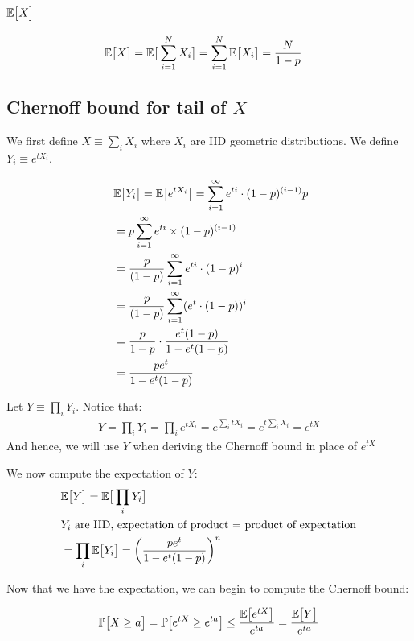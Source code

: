 \documentclass{article}
\begin{document}
\subsection{$\mathbb{E}\big[ X \big]$}
\begin{align*}
    &\mathbb{E}\big[ X \big] = \mathbb{E}\big[ \sum_{i=1}^N X_i \big] = \sum_{i=1}^N \mathbb{E}\big[ X_i \big] = \frac{N}{1 - p}
\end{align*}
\subsection{Chernoff bound for tail of $X$}

We first define $X \equiv \sum_i X_i$ where $X_i$ are IID geometric distributions.
We define $Y_i \equiv e^{t X_i}$.

\begin{align*}
&\mathbb{E}\big[ Y_i \big] = \mathbb{E}\big[ e^{tX_i} \big] = \sum_{i=1}^{\infty} e^{ti} \cdot (1-p)^{(i - 1)} p \\
&= p \sum_{i=1}^{\infty} e^{ti} \times (1-p)^{(i - 1)} \\\
&= \frac{p}{(1 - p)} \sum_{i=1}^{\infty} e^{ti}  \cdot (1-p)^i \\
&= \frac{p}{(1 - p)} \sum_{i=1}^{\infty} (e^{t}\cdot  (1-p))^i \\
&= \frac{p}{1 - p} \cdot \frac{e^t (1 - p)}{1 - e^t (1 - p)}  \\
&= \frac{pe^t}{1 - e^t(1 - p)}
\end{align*}

Let $Y \equiv \prod_i Y_i$. Notice that:
\begin{align*}
Y = \prod_i Y_i = \prod_i e^{tX_i} = e^{\sum_i t X_i} = e^{t \sum_i X_i} = e^{tX}
\end{align*}
And hence, we will use $Y$ when deriving the Chernoff bound in place of $e^{tX}$


We now compute the expectation of $Y$:
\begin{align*}
&\mathbb{E}\big[ Y \big] = \mathbb{E}\big[ \prod_i Y_i \big]\\
&\text{$Y_i$ are IID, expectation of product = product of expectation} \\
& = \prod_i \mathbb{E}\big[ Y_i \big] = \bigg( \frac{pe^t}{1 - e^t(1 - p)} \bigg)^n
\end{align*}

Now that we have the expectation, we can begin to compute the Chernoff bound:

\begin{align*}
\mathbb{P}\big [ X \geq a \big ] = \mathbb{P}\big [ e^{tX} \geq e^{ta} \big ] \leq \frac{\mathbb{E}\big[ e^{tX} \big]}{e^{ta}} = \frac{\mathbb{E}\big[ Y \big]}{e^{ta}}
\end{align*}
\end{document}
